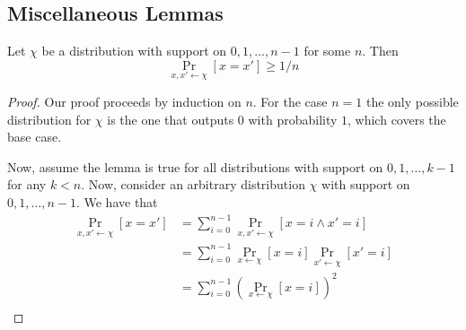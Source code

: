 
\subsection{Miscellaneous Lemmas}
\label{sec:miscellaneous-lemmas}

\begin{lemma}\label{lem:collision_lemma}
Let $\chi$ be a distribution with support on $0, 1, \ldots, n-1$ for some $n$. Then
\[\Pr_{x, x' \gets \chi}[x=x']\geq 1/n\]
\end{lemma}
\begin{proof}
Our proof proceeds by induction on $n$. For the case $n=1$ the only possible distribution for $\chi$ is the one that outputs $0$ with probability $1$, which covers the base case.

Now, assume the lemma is true for all distributions with support on $0, 1, \ldots, k-1$ for any $k < n$. Now, consider an arbitrary distribution $\chi$ with support on $0,1,\ldots, n-1$. We have that 
\begin{align*}
\Pr_{x,x' \gets \chi}[x=x']&=\sum_{i=0}^{n-1}\Pr_{x, x' \gets \chi}[x=i \wedge x' = i]\\
&=\sum_{i=0}^{n-1}\Pr_{x \gets \chi}[x=i]\Pr_{x' \gets \chi}[x'=i]\\
&=\sum_{i=0}^{n-1}(\Pr_{x \gets \chi}[x=i])^2\\
\end{align*}
\end{proof}


